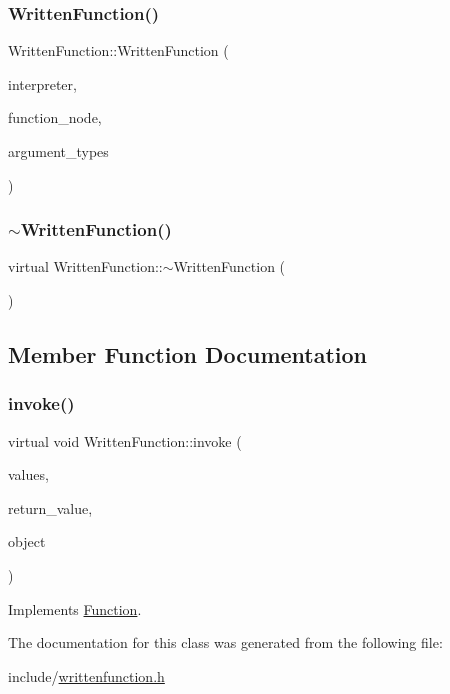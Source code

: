 \subsubsection{\texorpdfstring{Written\+Function()}{WrittenFunction()}}
{\footnotesize\ttfamily Written\+Function\+::\+Written\+Function (\begin{DoxyParamCaption}\item[{\hyperlink{classInterpreter}{Interpreter} $\ast$}]{interpreter,  }\item[{\hyperlink{classFunctionNode}{Function\+Node} $\ast$}]{function\+\_\+node,  }\item[{std\+::vector$<$ \hyperlink{classVarType}{Var\+Type} $>$}]{argument\+\_\+types }\end{DoxyParamCaption})}

\mbox{\label{classWrittenFunction_a46facc10f998146c7709772b0b662ad6}} 
\subsubsection{\texorpdfstring{$\sim$\+Written\+Function()}{~WrittenFunction()}}
{\footnotesize\ttfamily virtual Written\+Function\+::$\sim$\+Written\+Function (\begin{DoxyParamCaption}{ }\end{DoxyParamCaption})\hspace{0.3cm}{\ttfamily [virtual]}}



\subsection{Member Function Documentation}
\mbox{\label{classWrittenFunction_afe56e5eb6a13f6e38ab5ec87e371d745}} 
\subsubsection{\texorpdfstring{invoke()}{invoke()}}
{\footnotesize\ttfamily virtual void Written\+Function\+::invoke (\begin{DoxyParamCaption}\item[{std\+::vector$<$ \hyperlink{classValue}{Value} $>$}]{values,  }\item[{\hyperlink{classValue}{Value} $\ast$}]{return\+\_\+value,  }\item[{std\+::shared\+\_\+ptr$<$ \hyperlink{classObject}{Object} $>$}]{object }\end{DoxyParamCaption})\hspace{0.3cm}{\ttfamily [virtual]}}



Implements \hyperlink{classFunction_a84f9a63e68becc27e58ea738ba4cd698}{Function}.



The documentation for this class was generated from the following file\+:\begin{DoxyCompactItemize}
\item 
include/\hyperlink{writtenfunction_8h}{writtenfunction.\+h}\end{DoxyCompactItemize}
